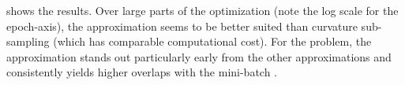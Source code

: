  shows the results. Over large parts of
the optimization (note the log scale for the epoch-axis), the \mc approximation
seems to be better suited than curvature sub-sampling (which has comparable
computational cost). For the \cifarhun \allcnnc problem, the \mc approximation
stands out particularly early from the other approximations and consistently
yields higher overlaps with the mini-batch \ggn.




